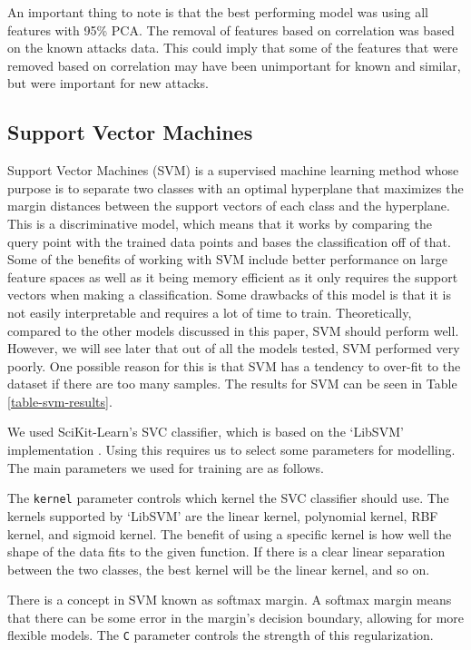 An important thing to note is that the best performing model was using all features with 95\% PCA. The removal of features based on correlation was based on the known attacks data. This could imply that some of the features that were removed based on correlation may have been unimportant for known and similar, but were important for new attacks.




\subsection{Support Vector Machines}
Support Vector Machines (SVM) is a supervised machine learning method whose purpose is to separate two classes with an optimal hyperplane that maximizes the margin distances between the support vectors of each class and the hyperplane. This is a discriminative model, which means that it works by comparing the query point with the trained data points and bases the classification off of that. Some of the benefits of working with SVM include better performance on large feature spaces as well as it being memory efficient as it only requires the support vectors when making a classification. Some drawbacks of this model is that it is not easily interpretable and requires a lot of time to train. Theoretically, compared to the other models discussed in this paper, SVM should perform well. However, we will see later that out of all the models tested, SVM performed very poorly. One possible reason for this is that SVM has a tendency to over-fit to the dataset if there are too many samples. The results for SVM can be seen in Table \ref{table-svm-results}.



We used SciKit-Learn's SVC classifier, which is based on the `LibSVM' implementation \cite{scikit-learn,chang2011libsvm}. Using this requires us to select some parameters for modelling. The main parameters we used for training are as follows.

The \lstinline{kernel} parameter controls which kernel the SVC classifier should use. The kernels supported by `LibSVM' are the linear kernel, polynomial kernel, RBF kernel, and sigmoid kernel. The benefit of using a specific kernel is how well the shape of the data fits to the given function. If there is a clear linear separation between the two classes, the best kernel will be the linear kernel, and so on.

There is a concept in SVM known as softmax margin. A softmax margin means that there can be some error in the margin's decision boundary, allowing for more flexible models. The \lstinline{C} parameter controls the strength of this regularization.

